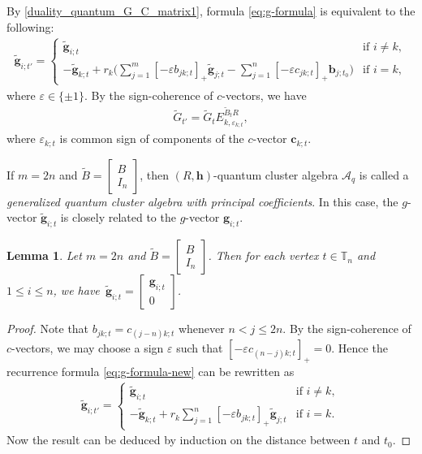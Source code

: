 \documentclass[pdftex]{sigma}
\numberwithin{equation}{section}
\newtheorem{Lemma}[Theorem]{Lemma}
\begin{document}
By \eqref{duality_quantum_G_C_matrix1}, formula \eqref{eq:g-formula} is equivalent to the following:
 \begin{align}\label{eq:g-formula-new}
 \mathbf{\tilde{g}}_{i;t'}=
 \begin{cases}
 \mathbf{\tilde{g}}_{i;t} & \text{if } i\neq k,\\
 \displaystyle -\mathbf{\tilde{g}}_{k;t}+r_{k}\biggl(\sum\limits_{j=1}^{m}[-\varepsilon b_{jk;t}]_+\mathbf{\tilde{g}}_{j;t}-\sum\limits_{j=1}^{n}[-\varepsilon c_{jk;t}]_+\mathbf{b}_{j;t_0}\biggr) & \text{if }i=k,
 \end{cases}
 \end{align}
 where $\varepsilon\in\{\pm 1\}$.
By the sign-coherence of $c$-vectors, we have
\begin{align}\label{eq:g-matrix}
 \tilde{G}_{t'}=\tilde{G}_{t}E_{k,\varepsilon_{k;t}}^{\tilde{B}_{t}R},
\end{align}
where $\varepsilon_{k;t}$ is common sign of components of the $c$-vector $\mathbf{c}_{k;t}$.

If $m=2n$ and $\tilde{B}=\left[\begin{smallmatrix}
 B\\ I_n
 \end{smallmatrix}\right]$, then $(R,\mathbf{h})$-quantum cluster algebra $\mathcal{A}_q$ is called a {\it generalized quantum cluster algebra with principal coefficients}. In this case, the $g$-vector $\tilde{\mathbf{g}}_{i;t}$ is closely related to the $g$-vector $\mathbf{g}_{i;t}$.
\begin{Lemma}\label{l:g-vector-comparison}
 Let $m=2n$ and $\tilde{B}=\left[\begin{smallmatrix}
 B\\ I_n
 \end{smallmatrix}\right]$. Then for each vertex $t\in \mathbb{T}_n$ and $1\leq i\leq n$, we have~${\tilde{\mathbf{g}}_{i;t}=\left[\begin{smallmatrix}
 \mathbf{g}_{i;t}\\ 0
 \end{smallmatrix}\right]}$.
\end{Lemma}
\begin{proof}
 Note that $b_{jk;t}=c_{(j-n)k;t}$ whenever $n<j\leq 2n$. By the sign-coherence of $c$-vectors, we may choose a sign $\varepsilon$ such that $[-\varepsilon c_{(n-j)k;t}]_+=0$. Hence the recurrence formula \eqref{eq:g-formula-new} can be rewritten as
 \begin{align*}
 \tilde{\mathbf{g}}_{i;t'}= \begin{cases}
 \mathbf{\tilde{g}}_{i;t} & \text{if } i\neq k,\\
 \displaystyle-\mathbf{\tilde{g}}_{k;t}+r_{k}\sum\limits_{j=1}^{n}[-\varepsilon b_{jk;t}]_+\mathbf{\tilde{g}}_{j;t} & \text{if }i=k.
 \end{cases}
 \end{align*}
 Now the result can be deduced by induction on the distance between $t$ and $t_0$.
\end{proof}
\end{document}
